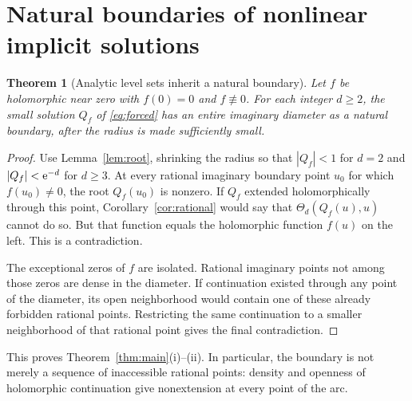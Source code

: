 \documentclass[11pt,a4paper]{article}
\numberwithin{equation}{section}
\newtheorem{theorem}{Theorem}[section]
\theoremstyle{definition}\newtheorem{definition}[theorem]{Definition}
\theoremstyle{remark}\newtheorem{remark}[theorem]{Remark}
\theoremstyle{definition}
\begin{document}
\section{Natural boundaries of nonlinear implicit solutions}
\label{sec:natural}
\begin{theorem}[Analytic level sets inherit a natural boundary]
\label{thm:forcing}
Let $f$ be holomorphic near zero with $f(0)=0$ and $f\not\equiv0$. For each
integer $d\ge2$, the small solution $Q_f$ of \eqref{eq:forced} has an entire
imaginary diameter as a natural boundary, after the radius is made
sufficiently small.
\end{theorem}
\begin{proof}
Use Lemma~\ref{lem:root}, shrinking the radius so that $|Q_f|<1$ for $d=2$
and $|Q_f|<\mathrm e^{-d}$ for $d\ge3$. At every rational imaginary boundary point
$u_0$ for which $f(u_0)\ne0$, the root $Q_f(u_0)$ is nonzero.
If $Q_f$ extended holomorphically through this point, Corollary~\ref{cor:rational}
would say that $\Theta_d(Q_f(u),u)$ cannot do so. But that function equals
the holomorphic function $f(u)$ on the left. This is a contradiction.

The exceptional zeros of $f$ are isolated. Rational imaginary points not among
those zeros are dense in the diameter. If continuation existed through any
point of the diameter, its open neighborhood would contain one of these
already forbidden rational points. Restricting the same continuation to a
smaller neighborhood of that rational point gives the final contradiction.
\end{proof}
This proves Theorem~\ref{thm:main}(i)--(ii). In particular, the boundary is not
merely a sequence of inaccessible rational points: density and openness of
holomorphic continuation give nonextension at every point of the arc.
\end{document}
